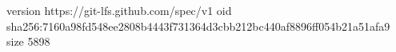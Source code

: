 version https://git-lfs.github.com/spec/v1
oid sha256:7160a98fd548ee2808b4443f731364d3cbb212bc440af8896ff054b21a51afa9
size 5898
